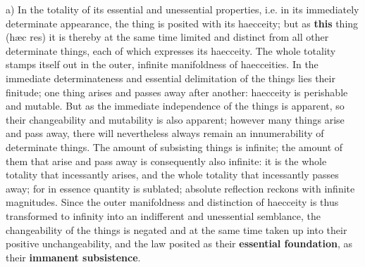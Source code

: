 \documentclass[12pt,a4paper,openany]{book}
\newcommand{\opage}[1]{\marginnote{\footnotesize\textit{[#1]}}}
\begin{document}
a) In the totality of its essential and unessential
properties, i.e. in its immediately determinate appearance, the thing is posited with its haecceity; but
as \textbf{this} thing (hæc res) it is thereby at the same time
limited and distinct from all other determinate
things, each of which expresses its
\setcounter{footnote}{0}%
\opage{183}haecceity. The whole totality stamps itself out in the outer, infinite manifoldness of haecceities. In
the immediate determinateness and essential
delimitation of the things lies their finitude; one
thing arises and passes away after another: haecceity
is perishable and mutable. But as
the immediate independence of the things is apparent,
so their changeability and mutability is
also apparent; however many things
arise and pass away, there will nevertheless always remain an innumerability of determinate things.
The amount of subsisting things is infinite; the amount of them that arise and
pass away is consequently also infinite: it is the
whole totality that incessantly arises, and the whole
totality that incessantly passes away; for in essence
quantity is sublated; absolute reflection
reckons with infinite magnitudes. Since the outer manifoldness and distinction of haecceity is thus transformed to
infinity into an indifferent and unessential
semblance, the changeability of the things is negated
and at the same time taken up into their positive unchangeability,
and the law posited as their \textbf{essential foundation},
as their \textbf{immanent subsistence}.
\end{document}
